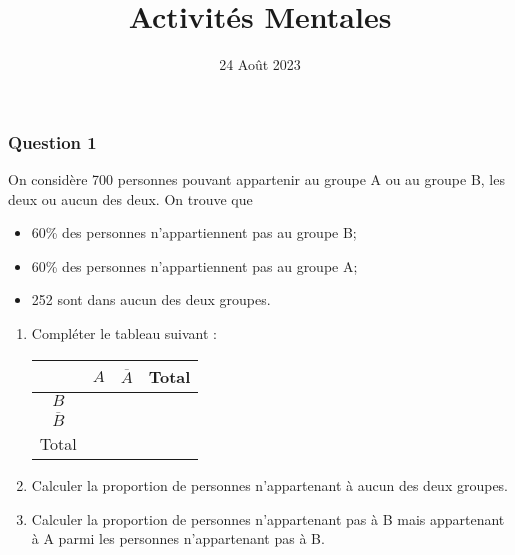 \documentclass[15pt, mathserif]{beamer}
\title{Activités Mentales}
\date{24 Août 2023}
\begin{document}
\begin{frame}
    \titlepage
\end{frame}

\begin{frame} 
	\frametitle{Question 1}
On considère 700 personnes pouvant appartenir au groupe A ou au groupe B, les deux ou aucun des deux. On trouve que 
 \begin{itemize} 
 \item 60\%  des personnes n'appartiennent pas au groupe B; 
 \item 60\% des personnes n'appartiennent pas au groupe A; 
 \item 252 sont dans aucun des deux groupes.
 \end{itemize} 
 \begin{enumerate} 
 \item Compléter le tableau suivant : 
 \hfil \begin{tabular}{|c|c|c|c|} 
 \cline{2-4}   
 \multicolumn{1}{c|}{} & $A$ & $\overline{A}$ & Total\\ \hline 
 $B$  &    & &   \\\hline 
 $\overline{B}$   &  &    &    \\\hline	
 Total   & &  &  \\\hline  
 \end{tabular} 
 \item Calculer la proportion de personnes n'appartenant  à aucun des deux groupes. 
 \item Calculer la proportion de personnes n'appartenant pas à B mais appartenant à A parmi les personnes n'appartenant pas à B. 
  \end{enumerate} 
 \end{frame}
\end{document}
